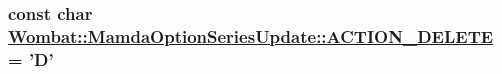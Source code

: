 \hypertarget{classWombat_1_1MamdaOptionSeriesUpdate_6ce2cf0215db3449708108d79846698f}{
\subsubsection[ACTION\_\-DELETE]{\setlength{\rightskip}{0pt plus 5cm}const char \hyperlink{classWombat_1_1MamdaOptionSeriesUpdate_6ce2cf0215db3449708108d79846698f}{Wombat::Mamda\-Option\-Series\-Update::ACTION\_\-DELETE} = 'D'}}
\label{classWombat_1_1MamdaOptionSeriesUpdate_6ce2cf0215db3449708108d79846698f}


